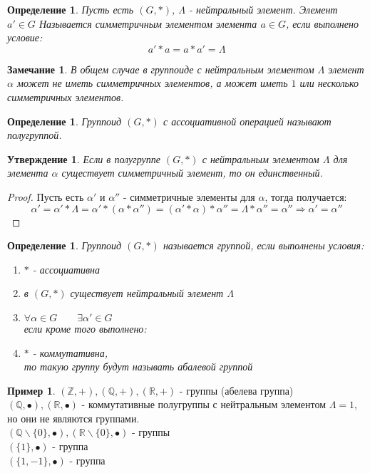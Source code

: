 \documentclass[12pt,oneside]{article}
\newtheorem{determ}[theorem]{Определение}
\newtheorem{ffff}[theorem]{Замечание}
\newtheorem{iwantthat}[theorem]{Утверждение}
\theoremstyle{definition}
\newtheorem{example}[theorem]{Пример}
\newcommand{\ZZ}{\mathbb{Z}}
\newcommand{\QQ}{\mathbb{Q}}
\newcommand{\RR}{\mathbb{R}}
\begin{document}
\begin{determ}
	Пусть есть $(G,*)$, $\Lambda$ - нейтральный элемент. Элемент $a'\in G$ Называется симметричным элементом элемента $a \in G$, если выполнено условие:
	\begin{equation}
		a'*a=a*a'=\Lambda
	\end{equation}
\end{determ}

\begin{ffff}
	В общем случае в группоиде с нейтральным элементом $\Lambda$ элемент $\alpha$ может не иметь симметричных элементов, а может иметь $1$ или несколько симметричных элементов.
\end{ffff}

\begin{determ}
	Группоид $(G,*)$ с ассоциативной операцией называют полугруппой.
\end{determ}

\begin{iwantthat}
	Если в полугруппе $(G,*)$ с нейтральным элементом $\Lambda$ для элемента $\alpha$ существует симметричный элемент, то он единственный.
\end{iwantthat}
\begin{proof}
	Пусть есть $\alpha'$ и $\alpha''$ - симметричные элементы для $\alpha$, тогда получается:
	\begin{equation}
	\alpha'=\alpha'*\Lambda=\alpha'*(\alpha*\alpha'')=(\alpha'*\alpha)*\alpha''=\Lambda*\alpha''=\alpha'' \Rightarrow \alpha'=\alpha''
	\end{equation}
\end{proof}

\begin{determ}
	Группоид $(G,*)$ называется группой, если выполнены условия:
	\begin{enumerate}
		\item $*$ - ассоциативна
		\item в $(G,*)$ существует нейтральный элемент $\Lambda$
		\item $\forall \alpha \in G \qquad \exists \alpha' \in G$\\
		если кроме того выполнено:
		\item $*$ - коммутативна,\\ то такую группу будут называть абалевой группой
	\end{enumerate}
\end{determ}

\begin{example}
	$(\ZZ,+), (\QQ,+), (\RR,+)$ - группы (абелева группа)\\
	$(\QQ,\bullet), (\RR, \bullet)$ - коммутативные полугруппы с нейтральным элементом $\Lambda=1$, но они не являются группами.\\
	$(\QQ \backslash \{0\}, \bullet), (\RR \backslash \{0\}, \bullet)$ - группы\\
	$(\{1\},\bullet)$ - группа\\
	$(\{1,-1\},\bullet)$ - группа\\
\end{example}
\end{document}

